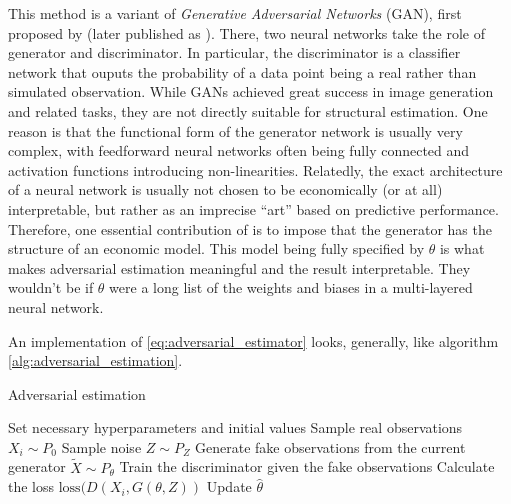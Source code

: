 This method is a variant of \textit{Generative Adversarial Networks} (GAN), first proposed by \textcite{goodfellow2014generative} (later published as \textcite{goodfellow2020generative}).
There, two neural networks take the role of generator and discriminator. %
In particular, the discriminator is a classifier network that ouputs the probability of a data point being a real rather than simulated observation.
While GANs achieved great success in image generation and related tasks, %
they are not directly suitable for structural estimation.
One reason is that the functional form of the generator network is usually very complex, with feedforward neural networks often being fully connected and activation functions introducing non-linearities.
Relatedly, the exact architecture of a neural network is usually not chosen to be economically (or at all) interpretable, but rather as an imprecise ``art'' based on predictive performance.
Therefore, one essential contribution of \textcite{kaji2023adversarial} is to impose that the generator has the structure of an economic model.
This model being fully specified by $\theta$ is what makes adversarial estimation meaningful and the result interpretable.
They wouldn't be if $\theta$ were a long list of the weights and biases in a multi-layered neural network.

An implementation of \ref{eq:adversarial_estimator} looks, generally, like algorithm \ref{alg:adversarial_estimation}.

\begin{algorithm}
    \caption{Adversarial estimation}
    \label{alg:adversarial_estimation}
    \begin{algorithmic}[1]
        \STATE Set necessary hyperparameters and initial values
        \STATE Sample real observations $X_i \sim P_0$
        \STATE Sample noise $Z \sim P_Z$
            \STATE Generate fake observations from the current generator $\widetilde{X} \sim P_{\theta}$ 
                \STATE Train the discriminator given the fake observations
            \ENDIF
            \STATE Calculate the loss $\text{loss}(D(X_i, G(\theta, Z))$
            \STATE Update $\hat{\theta}$ %
        \ENDWHILE
    \end{algorithmic}
\end{algorithm}

